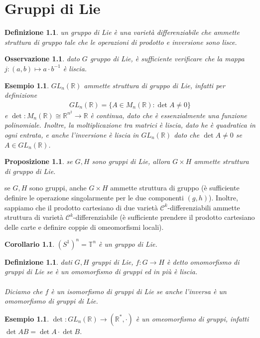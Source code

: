 \documentclass[oneside, 11pt]{amsbook}
\makeatletter
\newcommand{\C}{\mathcal{C}}
\newcommand{\T}{\mathbb{T}}
\newcommand{\R}{\mathbb{R}}
\newcommand{\co}[1]{\textit{#1}}
\newcommand{\0}{{(0)}}
\newcommand{\3}{{(3)}}
\theoremstyle{colonplain}
\newtheorem{prop}[thm]{Proposizione}
\newtheorem{cor}[thm]{Corollario}
\theoremstyle{colondefinition}
\newtheorem{defn}[thm]{Definizione}
\newtheorem{ex}[thm]{Esempio}
\theoremstyle{colonremark}
\newtheorem{rmk}[thm]{Osservazione}
\numberwithin{equation}{chapter}
\renewcommand{\proofname}{Dimostrazione}
\renewenvironment{proof}[1][\proofname]{\par
  \pushQED{\qed}%
  \normalfont \topsep6\p@\@plus6\p@\relax
  \trivlist
  \item[\hskip\labelsep\bfseries #1:]\ignorespaces
}{%
  \popQED\endtrivlist\@endpefalse
}
\makeatother
\begin{document}
\chapter{Gruppi di Lie}
\begin{defn}
    un \co{gruppo di Lie} è una varietà differenziabile che ammette struttura di gruppo tale che le operazioni di prodotto e inversione sono lisce.
\end{defn}
\begin{rmk}
    dato $G$ gruppo di Lie, è sufficiente verificare che la mappa $j : (a, b) \mapsto a \cdot b^{-1}$ è liscia.
\end{rmk}
\begin{ex}
    $GL_n(\R)$ ammette struttura di gruppo di Lie, infatti per definizione
    \begin{align}
        GL_n(\R) = \{A \in M_n(\R) : \det A \neq 0\}
    \end{align}
    e $\det : M_n(\R) \cong \R^{n^2} \longrightarrow \R$ è continua, dato che è essenzialmente una funzione polinomiale. Inoltre, la moltiplicazione tra matrici è liscia, dato he è quadratica in ogni entrata, e anche l'inversione è liscia in $GL_n(\R)$ dato che $\det A \neq 0$ se $A \in GL_n(\R)$.
\end{ex}
\begin{prop}
    se $G, H$ sono gruppi di Lie, allora $G \times H$ ammette struttura di gruppo di Lie.
\end{prop}
\begin{proof}
    se $G, H$ sono gruppi, anche $G \times H$ ammette struttura di gruppo (è sufficiente definire le operazione singolarmente per le due componenti $(g, h)$). Inoltre, sappiamo che il prodotto cartesiano di due varietà $\C^k$-differenziabili ammette struttura di varietà $\C^k$-differenziabile (è sufficiente prendere il prodotto cartesiano delle carte e definire coppie di omeomorfismi locali).
\end{proof}
\begin{cor}
    $(S^1)^n = \T^n$ è un gruppo di Lie.
\end{cor}
\begin{defn}
    dati $G, H$ gruppi di Lie, $f : G \longrightarrow H$ è detto \co{omomorfismo di gruppi di Lie} se è un omomorfismo di gruppi ed in più è liscia. \\ \\
    Diciamo che $f$ è un \co{isomorfismo di gruppi di Lie} se anche l'inversa è un omomorfismo di gruppi di Lie.
\end{defn}
\begin{ex}
    $\det : GL_n(\R) \longrightarrow (\R^*, \cdot)$ è un omeomorfismo di gruppi, infatti $\det AB = \det A \cdot \det B$.
\end{ex}
\end{document}
